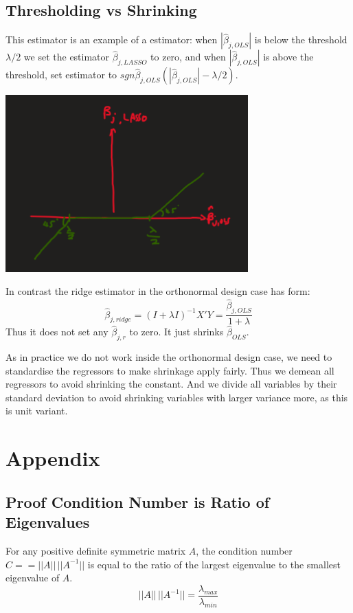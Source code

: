 \documentclass[DIV=14,titlepage=false]{scrreprt}
\begin{document}
\subsection{Thresholding vs Shrinking}
This estimator is an example of a \underline{} estimator: when \(|\hat{\beta}_{j,OLS}|\) is below the threshold \(\lambda/2\) we set the estimator \(\hat{\beta}_{j,LASSO}\) to zero, and when \(|\hat{\beta}_{j,OLS}|\) is above the threshold, set estimator to \(sgn{\hat{\beta}_{j,OLS}}(|\hat{\beta}_{j,OLS}|-\lambda/2)\).
\begin{center}
\includegraphics[width=0.7\textwidth]{./Images/soft thresholding lasso.png}
\end{center}
In contrast the ridge estimator in the orthonormal design case has form:
\[\hat{\beta}_{j,ridge}=(I+\lambda I)^{-1}X'Y=\frac{\hat{\beta}_{j,OLS}}{1+\lambda}\]
Thus it does not set any \(\hat{\beta}_{j,r}\) to zero. It just shrinks \(\hat{\beta}_{OLS}\).

\begin{note}
    As in practice we do not work inside the orthonormal design case, we need to standardise the regressors to make shrinkage apply fairly.
    Thus we demean all regressors to avoid shrinking the constant.
    And we divide all variables by their standard deviation to avoid shrinking variables with larger variance more, as this is unit variant.
\end{note}
\newpage
\section{Appendix}
\subsection{Proof Condition Number is Ratio of Eigenvalues}

\begin{theorem}
    For any positive definite symmetric matrix \(A\), the condition number \(C== ||A|| \, ||A^{-1}||\) is equal to the ratio of the largest eigenvalue to the smallest eigenvalue of \(A\).
    \[||A|| \, ||A^{-1}||=\frac{\lambda_{max}}{\lambda_{min}}\]
\end{theorem}
\end{document}
